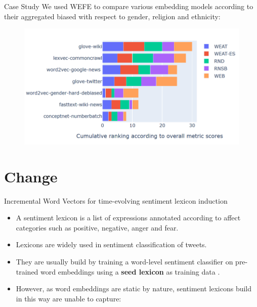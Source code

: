 \documentclass[handout]{beamer}
\begin{document}
\begin{frame}{Case Study}
\scriptsize{
We used WEFE to compare various embedding models according to their aggregated biased with respect to gender, religion and ethnicity:}


  \begin{figure}[h]
        	\includegraphics[scale = 0.3]{pics/weferanking.png}
        \end{figure}

\end{frame}


\section{Change}

\begin{frame}{Incremental Word Vectors for time-evolving sentiment lexicon induction}
\begin{scriptsize}
\begin{itemize}
 \item  A sentiment lexicon is a list of expressions annotated according to affect categories such as positive, negative, anger and fear.

 \item  Lexicons are widely used in sentiment classification of tweets.

 \item They are usually build by training a word-level sentiment classifier on pre-trained word embeddings using a \textbf{seed lexicon} as training data \cite{TangCol14}.

 \item  However, as word embeddings are static by nature, sentiment lexicons build in this way are  unable to capture:




\end{itemize}


\end{scriptsize}
\end{frame}
\end{document}
